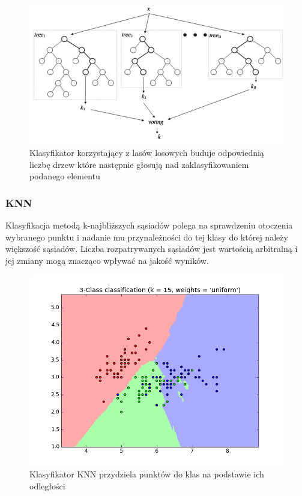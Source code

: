 \documentclass[a4paper]{report}
\begin{document}
\begin{figure}[!htp]
	\centering
	\includegraphics[scale=2.0]{rf.jpg}
	\caption{Klasyfikator korzystający z lasów losowych buduje odpowiednią liczbę drzew które następnie głosują nad zaklasyfikowaniem podanego elementu}
	\label{rffigure}
\end{figure}

\subsubsection{KNN}
Klasyfikacja metodą k-najbliższych sąsiadów polega na sprawdzeniu otoczenia wybranego punktu i nadanie mu przynależności do tej klasy do której należy większość sąsiadów. Liczba rozpatrywanych sąsiadów jest wartością arbitralną i jej zmiany mogą znacząco wpływać na jakość wyników.

\begin{figure}[!htp]
	\centering
	\includegraphics[scale=0.5]{knn.png}
	\caption{Klasyfikator KNN przydziela punktów do klas na podstawie ich odległości}
	\label{knnfigure}
\end{figure}
\end{document}

